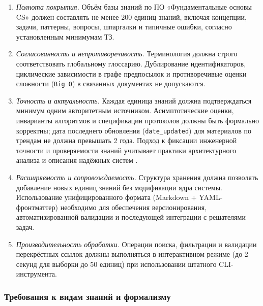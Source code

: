 \begin{enumerate}
    \item \textit{Полнота покрытия.} Объём базы знаний по ПО «Фундаментальные основы CS» должен составлять не менее 200 единиц знаний, включая концепции, задачи, паттерны, вопросы, шпаргалки и типичные ошибки, согласно установленным минимумам ТЗ.
    \item \textit{Согласованность и непротиворечивость.} Терминология должна строго соответствовать глобальному глоссарию. Дублирование идентификаторов, циклические зависимости в графе предпосылок и противоречивые оценки сложности (\texttt{Big O}) в связанных документах не допускаются.
    \item \textit{Точность и актуальность.} Каждая единица знаний должна подтверждаться минимум одним авторитетным источником. Асимптотические оценки, инварианты алгоритмов и спецификации протоколов должны быть формально корректны; дата последнего обновления (\texttt{date\_updated}) для материалов по трендам не должна превышать 2 года. Подход к фиксации инженерной точности и проверяемости знаний учитывает практики архитектурного анализа и описания надёжных систем \cite{Kleppmann2021}. 
    \item \textit{Расширяемость и сопровождаемость.} Структура хранения должна позволять добавление новых единиц знаний без модификации ядра системы. Использование унифицированного формата (Markdown + YAML-фронтматтер) необходимо для обеспечения версионирования, автоматизированной валидации и последующей интеграции с решателями задач.
    \item \textit{Производительность обработки.} Операции поиска, фильтрации и валидации перекрёстных ссылок должны выполняться в интерактивном режиме (до 2 секунд для выборки до 50 единиц) при использовании штатного CLI-инструмента.
\end{enumerate}\par

\subsubsection*{Требования к видам знаний и формализму}


